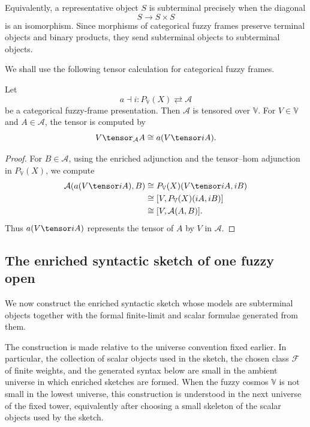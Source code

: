 Equivalently, a representative object \(S\) is subterminal precisely when the
diagonal
\[
    S\longrightarrow S\times S
\]
is an isomorphism. Since morphisms of categorical fuzzy frames preserve terminal
objects and binary products, they send subterminal objects to subterminal objects.

We shall use the following tensor calculation for categorical fuzzy frames.

\begin{lemma}
\label{lem:categorical-fuzzy-frames-are-tensored}
Let
\[
    a\dashv i:
    P_{\mathbb V}(X)\rightleftarrows\mathcal A
\]
be a categorical fuzzy-frame presentation. Then \(\mathcal A\) is tensored over
\(\mathbb V\). For \(V\in\mathbb V\) and \(A\in\mathcal A\), the tensor is computed
by
\[
    V\tensor_{\mathcal A}A
    \cong
    a(V\tensor iA).
\]
\end{lemma}

\begin{proof}
For \(B\in\mathcal A\), using the enriched adjunction and the tensor--hom
adjunction in \(P_{\mathbb V}(X)\), we compute
\[
\begin{aligned}
\mathcal A(a(V\tensor iA),B)
&\cong
P_{\mathbb V}(X)(V\tensor iA,iB)
\\
&\cong
[V,P_{\mathbb V}(X)(iA,iB)]
\\
&\cong
[V,\mathcal A(A,B)].
\end{aligned}
\]
Thus \(a(V\tensor iA)\) represents the tensor of \(A\) by \(V\) in
\(\mathcal A\).
\end{proof}

\subsection{The enriched syntactic sketch of one fuzzy open}
\label{subsec:enriched-syntactic-sketch-one-fuzzy-open}

We now construct the enriched syntactic sketch whose models are subterminal objects
together with the formal finite-limit and scalar formulae generated from them.

The construction is made relative to the universe convention fixed earlier. In
particular, the collection of scalar objects used in the sketch, the chosen class
\(\mathcal F\) of finite weights, and the generated syntax below are small in the
ambient universe in which enriched sketches are formed. When the fuzzy cosmos
\(\mathbb V\) is not small in the lowest universe, this construction is understood
in the next universe of the fixed tower, equivalently after choosing a small
skeleton of the scalar objects used by the sketch.

